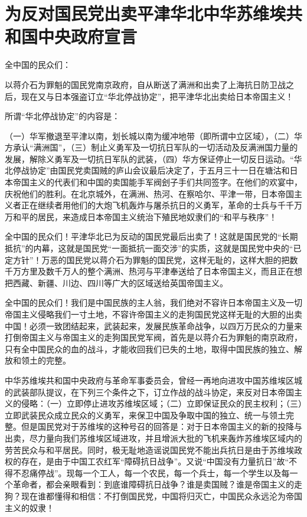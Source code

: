 \section[为反对国民党出卖平津华北中华苏维埃共和国中央政府宣言（一九三三年六月一日）]{为反对国民党出卖平津华北中华苏维埃共和国中央政府宣言}


全中国的民众们：

以蒋介石为罪魁的国民党南京政府，自从断送了满洲和出卖了上海抗日防卫战之后，现在又与日本强盗订立“华北停战协定”，把平津华北出卖给日本帝国主义！

所谓“华北停战协定”的内容是：

（一）华军撤退至平津以南，划长城以南为缓冲地带（即所谓中立区域），（二）华方承认“满洲国”，（三）制止义勇军及一切抗日军队的一切活动及反满洲国力量的发展，解除义勇军及一切抗日军队的武装，（四）华方保证停止一切反日运动。“华北停战协定”由国民党卖国贼的庐山会议最后决定了，于五月三十一日在塘沽和日本帝国主义的代表们和中国的卖国能手军阀刽子手们共同签字。在他们的欢宴中，庆祝他们的胜利。在北京城外，在满洲、热河、在察哈尔、平津一带，日本帝国主义者正在继续者用他们的大炮飞机轰炸与屠杀抗日的义勇军，革命的士兵与千千万万和平的居民，来造成日本帝国主义统治下殖民地奴隶们的“和平与秩序”！

全中国的民众们！平津华北已为反动的国民党最后出卖了！这就是国民党的“长期抵抗”的内幕，这就是国民党“一面抵抗一面交涉”的实质，这就是国民党中央的“已定方针”！万恶的国民党以蒋介石为罪魁的国民党，这样无耻的，这样大胆的把数千万方里及数千万人的整个满洲、热河与平津奉送给了日本帝国主义，而且正在想把西藏、新疆、川边、四川等广大的区域送给英国帝国主义。

全中国的民众们！我们是中国民族的主人翁，我们绝对不容许日本帝国主义及一切帝国主义侵略我们一寸土地，不容许帝国主义的走狗国民党这样无耻的大胆的出卖中国！必须一致团结起来，武装起来，发展民族革命战争，以四万万民众的力量来打倒帝国主义与帝国主义的走狗国民党军阀，首先是以蒋介石为罪魁的南京政府，只有全中国民众的血的战斗，才能收回我们已失的土地，取得中国民族的独立、解放和领土的完整。

中华苏维埃共和国中央政府与革命军事委员会，曾经一再地向进攻中国苏维埃区城的武装部队提议，在下列三个条件之下，订立作战的战斗协定，来反对日本帝国主义的侵略：（一）立即停止进攻苏维埃区域；（二）立即保证民众的民主权利；（三）立即武装民众成立民众的义勇军，来保卫中国及争取中国的独立、统一与领土完整。但是国民党对于苏维埃的这种号召的回答是：对于日本帝国主义的新的投降与出卖，尽力量向我们苏维埃区域进攻，并且增派大批的飞机来轰炸苏维埃区域内的劳苦民众与和平居民。同时，极无耻地造谣说国民党不能出兵抗日是由于苏维埃政权的存在，是由于中国工农红军“障碍抗日战争”。又说“中国没有力量抗日”故“不得不忍痛停战”。现每一个工人，每一个农民，每一个兵士，每一个学生以及每一个革命者，都会亲眼看到：到底谁障碍抗日战争？谁是卖国贼？谁是帝国主义的走狗？现在谁都懂得和相信：不打倒国民党，中国将归灭亡，中国民众永远沦为帝国主义的奴隶！

